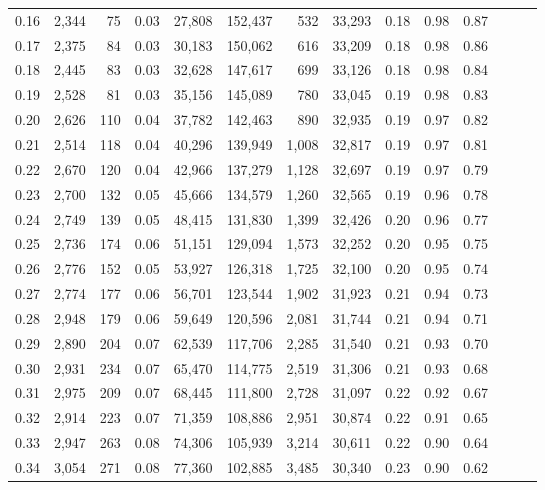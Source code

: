 \begin{tabular}{rrrrrrrrrrrrrr}
0.16 &  2,344 &   75 &  0.03 &   27,808 &  152,437 &     532 &  33,293 &  0.18 &  0.98 &      0.87 \\
0.17 &  2,375 &   84 &  0.03 &   30,183 &  150,062 &     616 &  33,209 &  0.18 &  0.98 &      0.86 \\
0.18 &  2,445 &   83 &  0.03 &   32,628 &  147,617 &     699 &  33,126 &  0.18 &  0.98 &      0.84 \\
0.19 &  2,528 &   81 &  0.03 &   35,156 &  145,089 &     780 &  33,045 &  0.19 &  0.98 &      0.83 \\
0.20 &  2,626 &  110 &  0.04 &   37,782 &  142,463 &     890 &  32,935 &  0.19 &  0.97 &      0.82 \\
0.21 &  2,514 &  118 &  0.04 &   40,296 &  139,949 &   1,008 &  32,817 &  0.19 &  0.97 &      0.81 \\
0.22 &  2,670 &  120 &  0.04 &   42,966 &  137,279 &   1,128 &  32,697 &  0.19 &  0.97 &      0.79 \\
0.23 &  2,700 &  132 &  0.05 &   45,666 &  134,579 &   1,260 &  32,565 &  0.19 &  0.96 &      0.78 \\
0.24 &  2,749 &  139 &  0.05 &   48,415 &  131,830 &   1,399 &  32,426 &  0.20 &  0.96 &      0.77 \\
0.25 &  2,736 &  174 &  0.06 &   51,151 &  129,094 &   1,573 &  32,252 &  0.20 &  0.95 &      0.75 \\
0.26 &  2,776 &  152 &  0.05 &   53,927 &  126,318 &   1,725 &  32,100 &  0.20 &  0.95 &      0.74 \\
0.27 &  2,774 &  177 &  0.06 &   56,701 &  123,544 &   1,902 &  31,923 &  0.21 &  0.94 &      0.73 \\
0.28 &  2,948 &  179 &  0.06 &   59,649 &  120,596 &   2,081 &  31,744 &  0.21 &  0.94 &      0.71 \\
0.29 &  2,890 &  204 &  0.07 &   62,539 &  117,706 &   2,285 &  31,540 &  0.21 &  0.93 &      0.70 \\
0.30 &  2,931 &  234 &  0.07 &   65,470 &  114,775 &   2,519 &  31,306 &  0.21 &  0.93 &      0.68 \\
0.31 &  2,975 &  209 &  0.07 &   68,445 &  111,800 &   2,728 &  31,097 &  0.22 &  0.92 &      0.67 \\
0.32 &  2,914 &  223 &  0.07 &   71,359 &  108,886 &   2,951 &  30,874 &  0.22 &  0.91 &      0.65 \\
0.33 &  2,947 &  263 &  0.08 &   74,306 &  105,939 &   3,214 &  30,611 &  0.22 &  0.90 &      0.64 \\
0.34 &  3,054 &  271 &  0.08 &   77,360 &  102,885 &   3,485 &  30,340 &  0.23 &  0.90 &      0.62 \\

\end{tabular}

